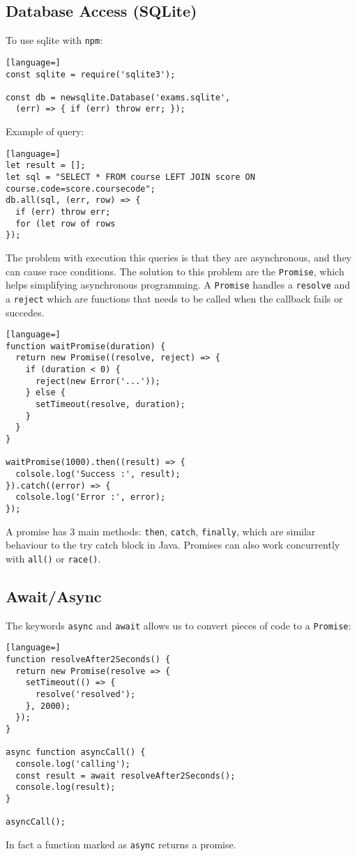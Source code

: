 \documentclass[12pt]{article}
\begin{document}
\subsection{Database Access (SQLite)}
To use sqlite with \texttt{npm}:
\begin{lstlisting}[language=]
const sqlite = require('sqlite3');

const db = newsqlite.Database('exams.sqlite', 
  (err) => { if (err) throw err; });
\end{lstlisting}
Example of query:
\begin{lstlisting}[language=]
let result = [];
let sql = "SELECT * FROM course LEFT JOIN score ON course.code=score.coursecode";
db.all(sql, (err, row) => {
  if (err) throw err;
  for (let row of rows
});
\end{lstlisting}
The problem with execution this queries is that they are asynchronous, and they can cause race conditions. The solution to this problem are the \texttt{Promise}, which helps simplifying asynchronous programming. A \texttt{Promise} handles a \texttt{resolve} and a \texttt{reject} which are functions that needs to be called when the callback fails or succedes.
\begin{lstlisting}[language=]
function waitPromise(duration) {
  return new Promise((resolve, reject) => {
    if (duration < 0) {
      reject(new Error('...'));
    } else {
      setTimeout(resolve, duration);
    }
  }
}

waitPromise(1000).then((result) => {
  colsole.log('Success :', result);
}).catch((error) => {
  colsole.log('Error :', error);
});
\end{lstlisting}
A promise has 3 main methods: \texttt{then}, \texttt{catch}, \texttt{finally}, which are similar behaviour to the try catch block in Java. Promises can also work concurrently with \texttt{all()} or \texttt{race()}.

\subsection{Await/Async}
The keywords \texttt{async} and \texttt{await} allows us to convert pieces of code to a \texttt{Promise}:
\begin{lstlisting}[language=]
function resolveAfter2Seconds() {
  return new Promise(resolve => {
    setTimeout(() => {
      resolve('resolved');
    }, 2000);
  });
}

async function asyncCall() {
  console.log('calling');
  const result = await resolveAfter2Seconds();
  console.log(result);
}

asyncCall();
\end{lstlisting}
In fact a function marked as \texttt{async} returns a promise.
\end{document}
